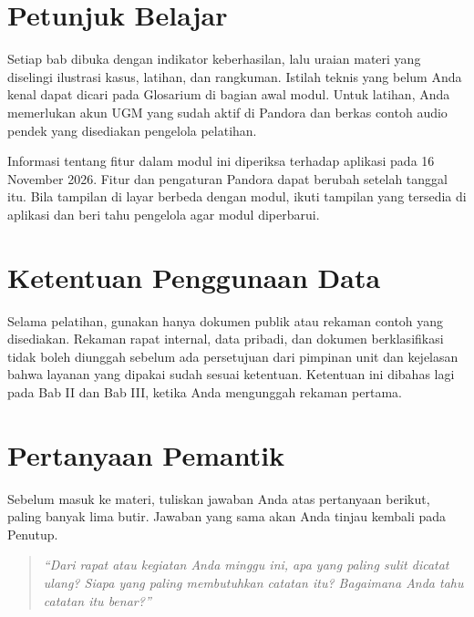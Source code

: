 \section{Petunjuk Belajar}
Setiap bab dibuka dengan indikator keberhasilan, lalu uraian materi yang diselingi ilustrasi kasus, latihan, dan rangkuman. Istilah teknis yang belum Anda kenal dapat dicari pada Glosarium di bagian awal modul. Untuk latihan, Anda memerlukan akun UGM yang sudah aktif di Pandora dan berkas contoh audio pendek yang disediakan pengelola pelatihan.

Informasi tentang fitur dalam modul ini diperiksa terhadap aplikasi pada 16 November 2026. Fitur dan pengaturan Pandora dapat berubah setelah tanggal itu. Bila tampilan di layar berbeda dengan modul, ikuti tampilan yang tersedia di aplikasi dan beri tahu pengelola agar modul diperbarui.

\section{Ketentuan Penggunaan Data}
Selama pelatihan, gunakan hanya dokumen publik atau rekaman contoh yang disediakan. Rekaman rapat internal, data pribadi, dan dokumen berklasifikasi tidak boleh diunggah sebelum ada persetujuan dari pimpinan unit dan kejelasan bahwa layanan yang dipakai sudah sesuai ketentuan. Ketentuan ini dibahas lagi pada Bab II dan Bab III, ketika Anda mengunggah rekaman pertama.

\section{Pertanyaan Pemantik}
Sebelum masuk ke materi, tuliskan jawaban Anda atas pertanyaan berikut, paling banyak lima butir. Jawaban yang sama akan Anda tinjau kembali pada Penutup.

\begin{quote}
\itshape ``Dari rapat atau kegiatan Anda minggu ini, apa yang paling sulit dicatat ulang? Siapa yang paling membutuhkan catatan itu? Bagaimana Anda tahu catatan itu benar?''
\end{quote}
